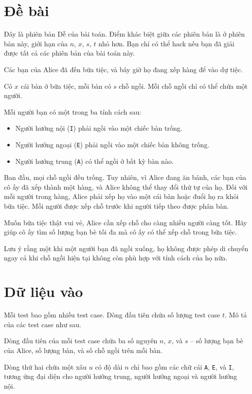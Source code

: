 \documentclass[11pt]{article}
\begin{document}
\section*{Đề bài}
Đây là phiên bản Dễ của bài toán. Điểm khác biệt giữa các phiên bản là ở phiên bản này, giới hạn của $n$, $x$, $s$, $t$ nhỏ hơn. Bạn chỉ có thể hack nếu bạn đã giải được tất cả các phiên bản của bài toán này.

Các bạn của Alice đã đến bữa tiệc, và bây giờ họ đang xếp hàng để vào dự tiệc.

Có $x$ cái bàn ở bữa tiệc, mỗi bàn có $s$ chỗ ngồi. Mỗi chỗ ngồi chỉ có thể chứa một người.

Mỗi người bạn có một trong ba tính cách sau:
\begin{itemize}
    \item Người hướng nội (\texttt{I}) phải ngồi vào một chiếc bàn trống.
    \item Người hướng ngoại (\texttt{E}) phải ngồi vào một chiếc bàn không trống.
    \item Người hướng trung (\texttt{A}) có thể ngồi ở bất kỳ bàn nào.
\end{itemize}

Ban đầu, mọi chỗ ngồi đều trống. Tuy nhiên, vì Alice đang ăn bánh, các bạn của cô ấy đã xếp thành một hàng, và Alice không thể thay đổi thứ tự của họ. Đối với mỗi người trong hàng, Alice phải xếp họ vào một cái bàn hoặc đuổi họ ra khỏi bữa tiệc. Mỗi người được xếp chỗ trước khi người tiếp theo được phân bàn.

Muốn bữa tiệc thật vui vẻ, Alice cần xếp chỗ cho càng nhiều người càng tốt. Hãy giúp cô ấy tìm số lượng bạn bè tối đa mà cô ấy có thể xếp chỗ trong bữa tiệc.

Lưu ý rằng một khi một người bạn đã ngồi xuống, họ không được phép di chuyển ngay cả khi chỗ ngồi hiện tại không còn phù hợp với tính cách của họ nữa.

\section*{Dữ liệu vào}
\begin{inputbox}
Mỗi test bao gồm nhiều test case. Dòng đầu tiên chứa số lượng test case $t$. Mô tả của các test case như sau.

Dòng đầu tiên của mỗi test case chứa ba số nguyên $n$, $x$, và $s$ – số lượng bạn bè của Alice, số lượng bàn, và số chỗ ngồi trên mỗi bàn.

Dòng thứ hai chứa một xâu $u$ có độ dài $n$ chỉ bao gồm các chữ cái \texttt{A}, \texttt{E}, và \texttt{I}, tương ứng đại diện cho người hướng trung, người hướng ngoại và người hướng nội.
\end{inputbox}
\end{document}
